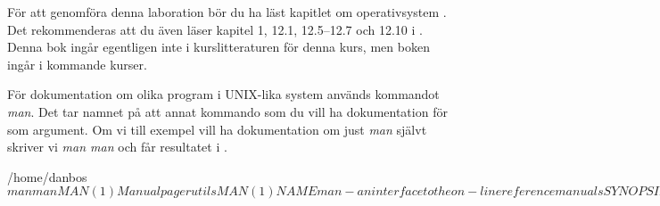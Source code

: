 För att genomföra denna laboration bör du ha läst kapitlet om operativsystem 
\citep[kapitel 3]{Brookshear2012csa}.
Det rekommenderas att du även läser kapitel 1, 12.1, 12.5--12.7 och 12.10 
i  \cite{nemeth2011ual}.
Denna bok ingår egentligen inte i kurslitteraturen för denna kurs, men boken 
ingår i kommande kurser.

För dokumentation om olika program i UNIX-lika system används kommandot 
\emph{man}.
Det tar namnet på att annat kommando som du vill ha dokumentation för som 
argument.
Om vi till exempel vill ha dokumentation om just \emph{man} självt skriver vi 
\emph{man man} och får resultatet i .
\begin{terminal}[float=tb,label={lst:manman},caption={Listningen av resultatet vid körningen av kommandot \code{man man}.}]
/home/danbos$ man man
MAN(1)						Manual pager utils						MAN(1)

NAME
	   man - an interface to the on-line reference manuals

SYNOPSIS
	   man  [-C  file]  [-d]  [-D]  [--warnings[=warnings]]  [-R encoding] [-L
	   locale] [-m system[,...]] [-M path] [-S list]  [-e  extension]  [-i|-I]
	   [--regex|--wildcard]   [--names-only]  [-a]  [-u]  [--no-subpages]  [-P
	   pager] [-r prompt] [-7] [-E encoding] [--no-hyphenation] [--no-justifi-
	   cation]  [-p  string]  [-t]  [-T[device]]  [-H[browser]] [-X[dpi]] [-Z]
	   [[section] page ...] ...
	   man -k [apropos options] regexp ...
	   man -K [-w|-W] [-S list] [-i|-I] [--regex] [section] term ...
	   man -f [whatis options] page ...
	   man -l [-C file] [-d] [-D] [--warnings[=warnings]]  [-R  encoding]  [-L
	   locale]  [-P  pager]  [-r  prompt]  [-7] [-E encoding] [-p string] [-t]
	   [-T[device]] [-H[browser]] [-X[dpi]] [-Z] file ...
	   man -w|-W [-C file] [-d] [-D] page ...
	   man -c [-C file] [-d] [-D] page ...
	   man [-hV]

DESCRIPTION
	   man is the system's manual pager. Each page argument given  to  man  is
	   normally  the  name of a program, utility or function.  The manual page
	   associated with each of these arguments is then found and displayed.  A
	   section,  if  provided, will direct man to look only in that section of
	   the manual.  The default action is to search in all  of  the  available
	   sections, following a pre-defined order and to show only the first page
	   found, even if page exists in several sections.

	   The table below shows the section numbers of the manual followed by the
	   types of pages they contain.
[...]
/home/danbos$
\end{terminal}
